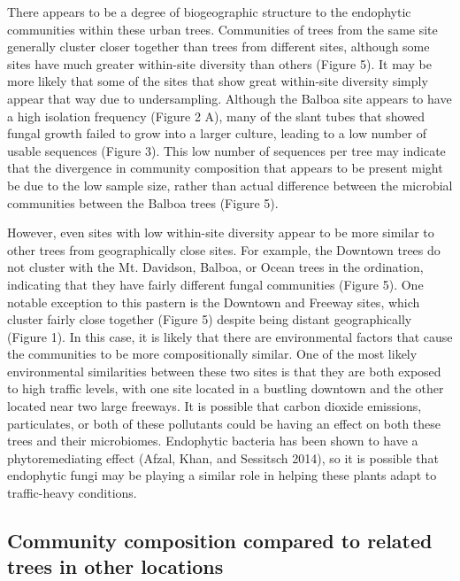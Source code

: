 \documentclass[fleqn,10pt,lineno]{wlpeerj} %
\begin{document}
There appears to be a degree of biogeographic structure to the endophytic communities within these urban trees. Communities of trees from the same site generally cluster closer together than trees from different sites, although some sites have much greater within-site diversity than others (Figure 5). It may be more likely that some of the sites that show great within-site diversity simply appear that way due to undersampling. Although the Balboa site appears to have a high isolation frequency (Figure 2 A), many of the slant tubes that showed fungal growth failed to grow into a larger culture, leading to a low number of usable sequences (Figure 3). This low number of sequences per tree may indicate that the divergence in community composition that appears to be present might be due to the low sample size, rather than actual difference between the microbial communities between the Balboa trees (Figure 5).

However, even sites with low within-site diversity appear to be more similar to other trees from geographically close sites. For example, the Downtown trees do not cluster with the Mt. Davidson, Balboa, or Ocean trees in the ordination, indicating that they have fairly different fungal communities (Figure 5). One notable exception to this pastern is the Downtown and Freeway sites, which cluster fairly close together (Figure 5) despite being distant geographically (Figure 1). In this case, it is likely that there are environmental factors that cause the communities to be more compositionally similar. One of the most likely environmental similarities between these two sites is that they are both exposed to high traffic levels, with one site located in a bustling downtown and the other located near two large freeways. It is possible that carbon dioxide emissions, particulates, or both of these pollutants could be having an effect on both these trees and their microbiomes. Endophytic bacteria has been shown to have a phytoremediating effect (Afzal, Khan, and Sessitsch 2014), so it is possible that endophytic fungi may be playing a similar role in helping these plants adapt to traffic-heavy conditions.

\hypertarget{community-composition-compared-to-related-trees-in-other-locations}{%
\subsection*{Community composition compared to related trees in other locations}\label{community-composition-compared-to-related-trees-in-other-locations}}
\end{document}
